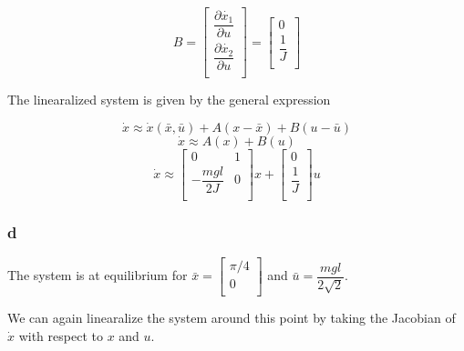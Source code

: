 \documentclass[11pt]{article}
\begin{document}
\[
    B =
    \begin{bmatrix}
        \dfrac{\partial \dot{x_1}}{\partial u} \\
        \dfrac{\partial \dot{x_2}}{\partial u} \\
    \end{bmatrix}
    = \begin{bmatrix}
        0 \\
        \dfrac{1}{J} \\
    \end{bmatrix}
\]

The linearalized system is given by the general expression

\[ \dot{x} \approx \dot{x}(\bar{x}, \bar{u}) + A (x - \bar{x}) + B (u - \bar{u}) \]
\[ \dot{x} \approx A(x) + B (u) \]
\[
    \dot{x} \approx
    \begin{bmatrix}
        0 & 1 \\
        - \dfrac{mgl}{2J} & 0 \\
    \end{bmatrix}
    x +
    \begin{bmatrix}
        0 \\
        \dfrac{1}{J} \\
    \end{bmatrix}
    u
\]

\subsubsection{d}

The system is at equilibrium for $\bar{x} = \begin{bmatrix} \pi / 4 \\ 0 \\ \end{bmatrix}$ and $\bar{u} = \dfrac{mgl}{2\sqrt{2}}$.

We can again linearalize the system around this point by taking the Jacobian of $\dot{x}$ with respect to $x$ and $u$.
\end{document}
